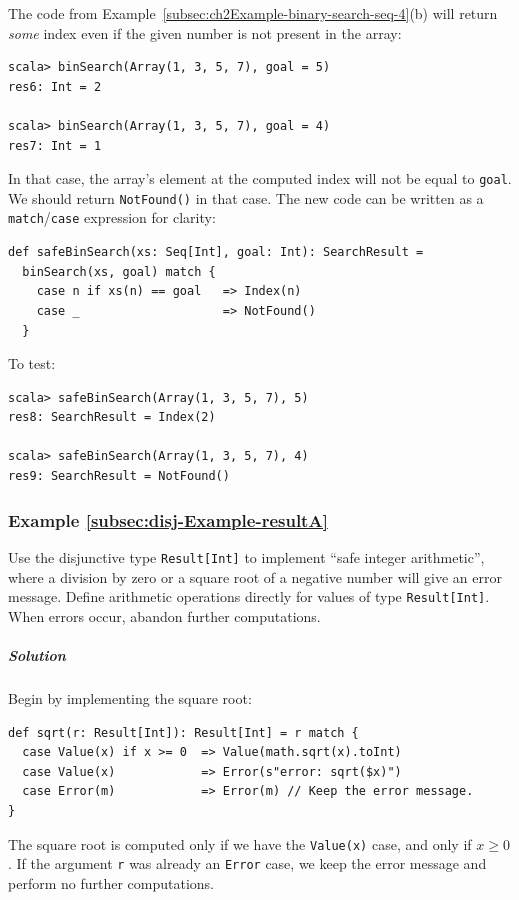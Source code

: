 The code from Example~\ref{subsec:ch2Example-binary-search-seq-4}(b)
will return \emph{some} index even if the given number is not present
in the array: 
\begin{lstlisting}
scala> binSearch(Array(1, 3, 5, 7), goal = 5)
res6: Int = 2

scala> binSearch(Array(1, 3, 5, 7), goal = 4)
res7: Int = 1
\end{lstlisting}
In that case, the array\textsf{'}s element at the computed index will not be
equal to \lstinline!goal!. We should return \lstinline!NotFound()!
in that case. The new code can be written as a \lstinline!match!/\lstinline!case!
expression for clarity:
\begin{lstlisting}
def safeBinSearch(xs: Seq[Int], goal: Int): SearchResult =
  binSearch(xs, goal) match {
    case n if xs(n) == goal   => Index(n) 
    case _                    => NotFound()
  }
\end{lstlisting}
To test:
\begin{lstlisting}
scala> safeBinSearch(Array(1, 3, 5, 7), 5)
res8: SearchResult = Index(2)

scala> safeBinSearch(Array(1, 3, 5, 7), 4)
res9: SearchResult = NotFound()
\end{lstlisting}


\subsubsection{Example \label{subsec:disj-Example-resultA}\ref{subsec:disj-Example-resultA}}

Use the disjunctive type \lstinline!Result[Int]! to implement \textsf{``}safe
integer arithmetic\textsf{''}, where a division by zero or a square root of
a negative number will give an error message. Define arithmetic operations
directly for values of type \lstinline!Result[Int]!. When errors
occur, abandon further computations.

\subparagraph{Solution}

Begin by implementing the square root:
\begin{lstlisting}
def sqrt(r: Result[Int]): Result[Int] = r match {
  case Value(x) if x >= 0  => Value(math.sqrt(x).toInt)
  case Value(x)            => Error(s"error: sqrt($x)")
  case Error(m)            => Error(m) // Keep the error message.
}
\end{lstlisting}
The square root is computed only if we have the \lstinline!Value(x)!
case, and only if $x\geq0$. If the argument \lstinline!r! was already
an \lstinline!Error! case, we keep the error message and perform
no further computations.

